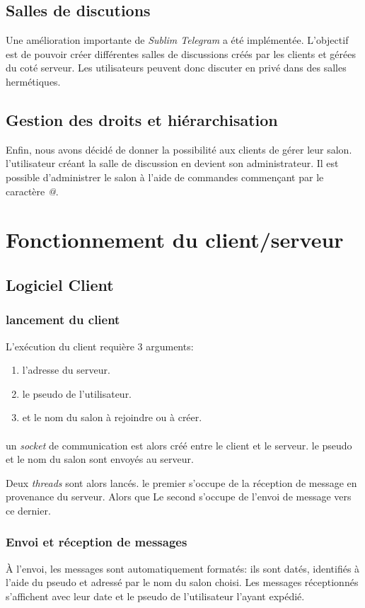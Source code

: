 \documentclass[a4paper, 12pt]{article}
\begin{document}
\subsection{Salles de discutions}
Une amélioration importante de \emph{Sublim Telegram} a été implémentée. L'objectif est de pouvoir créer différentes salles de discussions créés par les clients et gérées du coté serveur. Les utilisateurs peuvent donc discuter en privé dans des salles hermétiques.
\subsection{Gestion des droits et hiérarchisation}
Enfin, nous avons décidé de donner la possibilité aux clients de gérer leur salon. l'utilisateur créant la salle de discussion en devient son administrateur. Il est possible d'administrer le salon à l'aide de commandes commençant par le caractère \emph{@}. 

\section{Fonctionnement du client/serveur}
\subsection{Logiciel Client}
\subsubsection{lancement du client}
L'exécution du client requière 3 arguments:
\begin{enumerate}
    \item l'adresse du serveur.
    \item le pseudo de l'utilisateur.
    \item et le nom du salon à rejoindre ou à créer.
\end{enumerate}
\paragraph{}
un \emph{socket} de communication est alors créé entre le client et le serveur. le pseudo et le nom du salon sont envoyés au serveur.

Deux \emph{threads} sont alors lancés. le premier s'occupe de la réception de message en provenance du serveur. Alors que Le second s'occupe de l'envoi de message vers ce dernier.

\subsubsection{Envoi et réception de messages}
À l'envoi, les messages sont automatiquement formatés: ils sont datés, identifiés à l'aide du pseudo et adressé par le nom du salon choisi. Les messages réceptionnés s'affichent avec leur date et le pseudo de l'utilisateur l'ayant expédié.
\end{document}
